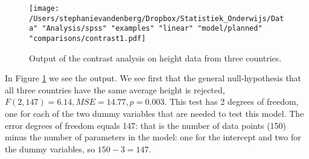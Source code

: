 \begin{knitrout}
\color{fgcolor}
\end{knitrout}

\begin{knitrout}
\color{fgcolor}\begin{kframe}
\begin{alltt}
\hlstd{(}\hlopt{$} \hlkwb{<-} \hlstd{(}\hlstd{,} \hlstd{,} \hlstd{)}
\end{alltt}


{\ttfamily\noindent\bfseries\color{errorcolor}{\#\# Error in contrasts(factor(mpg\$drv)) <- c(0, 1, 0): object 'mpg' not found}}\end{kframe}
\end{knitrout}




\begin{figure}[h]
    \begin{center}
       \texttt{[image: /Users/stephanievandenberg/Dropbox/Statistiek\_Onderwijs/Data" "Analysis/spss" "examples" "linear" "model/planned" "comparisons/contrast1.pdf]}
    \end{center}
    \caption{Output of the contrast analysis on height data from three countries.}
    \label{fig:contrast1}
\end{figure}



In Figure \ref{fig:contrast1} we see the output. We see first that the general null-hypothesis that all three countries have the same average height is rejected, $F(2, 147)= 6.14, MSE=14.77, p = 0.003$. This test has 2 degrees of freedom, one for each of the two dummy variables that are needed to test this model. The error degrees of freedom equals 147: that is the number of data points (150) minus the number of parameters in the model: one for the intercept and two for the dummy variables, so $150-3=147$.





